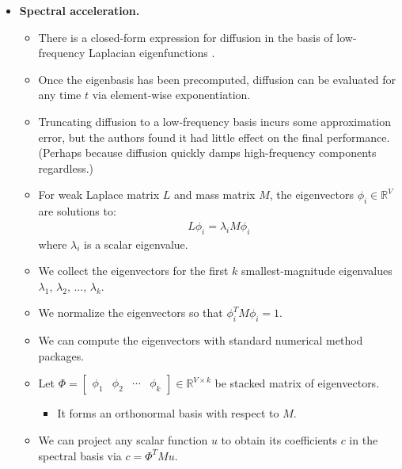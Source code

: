 \documentclass[10pt]{article}
\newcommand{\Real}{\mathbb{R}}
\begin{document}
\begin{itemize}
\begin{itemize}
        \item {\bf Spectral acceleration.}
        \begin{itemize}
            \item There is a closed-form expression for diffusion in the basis of low-frequency Laplacian eigenfunctions \cite{Vallet:2007:SGPwMH, Levy:2010:SMP}.
            
            \item Once the eigenbasis has been precomputed, diffusion can be evaluated for any time $t$ via element-wise exponentiation.
            
            \item Truncating diffusion to a low-frequency basis incurs some approximation error, but the authors found it had little effect on the final performance. (Perhaps because diffusion quickly damps high-frequency components regardless.)
            
            \item For weak Laplace matrix $L$ and mass matrix $M$, the eigenvectors $\phi_i \in \Real^V$ are solutions to:
            \begin{align*}
                L \phi_i = \lambda_i M \phi_i
            \end{align*}
            where $\lambda_i$ is a scalar eigenvalue.

            \item We collect the eigenvectors for the first $k$ smallest-magnitude eigenvalues $\lambda_1$, $\lambda_2$, $\dotsc$, $\lambda_k$.
            
            \item We normalize the eigenvectors so that $\phi_i^T M \phi_i = 1$.
            
            \item We can compute the eigenvectors with standard numerical method packages.
            
            \item Let $\Phi = \begin{bmatrix} \phi_1 & \phi_2 & \cdots & \phi_k \end{bmatrix} \in \Real^{V \times k}$ be stacked matrix of eigenvectors.
            \begin{itemize}
                \item It forms an orthonormal basis with respect to $M$.
            \end{itemize}

            \item We can project any scalar function $u$ to obtain its coefficients $c$ in the spectral basis via $c = \Phi^T M u$.
            

\end{itemize}
\end{itemize}
\end{itemize}
\end{document}
